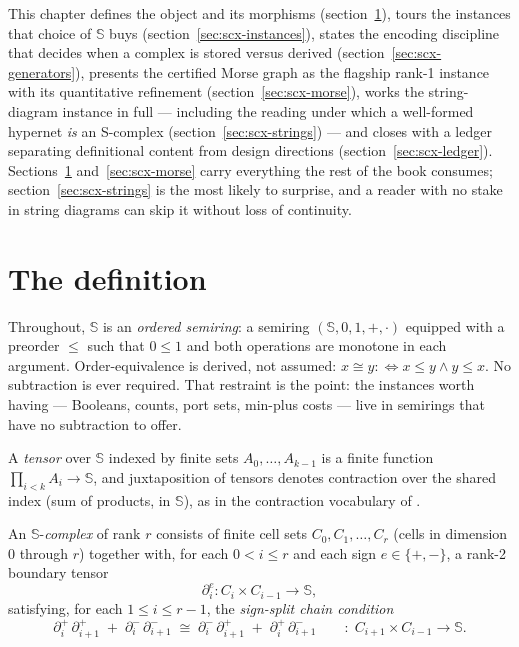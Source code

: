This chapter defines the object and its morphisms
(section~\ref{sec:scx-def}), tours the instances that choice of
$\mathbb{S}$ buys (section~\ref{sec:scx-instances}), states the
encoding discipline that decides when a complex is stored versus
derived (section~\ref{sec:scx-generators}), presents the certified
Morse graph as the flagship rank-1 instance with its quantitative
refinement (section~\ref{sec:scx-morse}), works the string-diagram
instance in full --- including the reading under which a well-formed
hypernet \emph{is} an S-complex (section~\ref{sec:scx-strings}) ---
and closes with a ledger separating definitional content from design
directions (section~\ref{sec:scx-ledger}).
Sections~\ref{sec:scx-def} and~\ref{sec:scx-morse} carry everything
the rest of the book consumes; section~\ref{sec:scx-strings} is the
most likely to surprise, and a reader with no stake in string
diagrams can skip it without loss of continuity.

\section{The definition}
\label{sec:scx-def}

Throughout, $\mathbb{S}$ is an \emph{ordered semiring}: a semiring
$(\mathbb{S}, 0, 1, +, \cdot)$ equipped with a preorder $\le$ such
that $0 \le 1$ and both operations are monotone in each argument.
Order-equivalence is derived, not assumed:
$x \cong y \mathrel{:\Leftrightarrow} x \le y \wedge y \le x$.
No subtraction is ever required. That restraint is the point: the
instances worth having --- Booleans, counts, port sets, min-plus
costs --- live in semirings that have no subtraction to offer.

A \emph{tensor} over $\mathbb{S}$ indexed by finite sets
$A_0, \dots, A_{k-1}$ is a finite function
$\prod_{i<k} A_i \to \mathbb{S}$, and juxtaposition of tensors
denotes contraction over the shared index (sum of products, in
$\mathbb{S}$), as in the contraction vocabulary of
.

\begin{definition}[S-complex]
\label{def:scomplex}
An $\mathbb{S}$-\emph{complex} of rank $r$ consists of finite cell
sets $C_0, C_1, \dots, C_r$ (cells in dimension $0$ through $r$)
together with, for each $0 < i \le r$ and each sign
$e \in \{+,-\}$, a rank-2 boundary tensor
\[
\partial_i^{e} \colon C_{i} \times C_{i-1} \longrightarrow \mathbb{S},
\]
satisfying, for each $1 \le i \le r-1$, the \emph{sign-split chain
condition}
\begin{equation}
\label{eq:scx-dd}
\partial_{i}^{+}\, \partial_{i+1}^{+} \;+\; \partial_{i}^{-}\, \partial_{i+1}^{-}
\;\cong\;
\partial_{i}^{-}\, \partial_{i+1}^{+} \;+\; \partial_{i}^{+}\, \partial_{i+1}^{-}
\qquad \colon\; C_{i+1} \times C_{i-1} \to \mathbb{S}.
\end{equation}
\end{definition}

